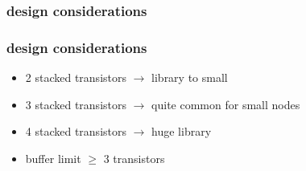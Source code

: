 \documentclass[aspectratio=169]{beamer}
\begin{document}
\begin{frame}
\frametitle{design considerations}
    \begin{figure}[h]
        \begin{center}
            \begin{circuitdiagram}{50}{33}
            \end{circuitdiagram}
        \end{center}
    \end{figure}
\end{frame}

\begin{frame}
\frametitle{design considerations}
    \begin{itemize}
        \item 2 stacked transistors $\rightarrow$ library to small
        \item 3 stacked transistors $\rightarrow$ quite common for small nodes
        \item 4 stacked transistors $\rightarrow$ huge library
        \item buffer limit $\ge$ 3 transistors
    \end{itemize}
\end{frame}
\end{document}

